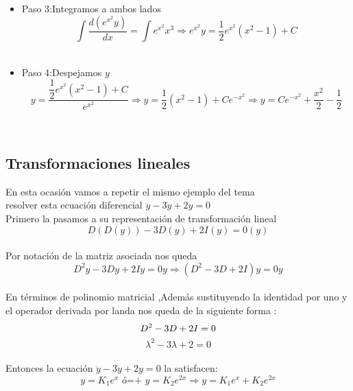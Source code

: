 \documentclass[10pt,a4paper]{article}
\begin{document}
{{{{{{{{{{{{\begin{itemize}
\item Paso 3:Integramos a ambos lados
\begin{equation*}
\int \dfrac{d(e^{x^2}y)}{dx}=\int e^{x^2}x^3 \Rightarrow e^{x^2}y=\dfrac{1}{2}e^{x^2}(x^{2}-1)+C
\end{equation*}
\,\\

\item Paso 4:Despejamos $y$
\begin{equation*}
y=\dfrac{\dfrac{1}{2}e^{x^2}(x^{2}-1)+C}{e^{x^2}}\Rightarrow y=\dfrac{1}{2}(x^{2}-1)+Ce^{-x^2}\Rightarrow y=Ce^{-x^2}+\dfrac{x^2}{2}-\dfrac{1}{2}
\end{equation*}
\end{itemize}
\,\\
\subsection{Transformaciones lineales}
En esta ocasión vamos a repetir el mismo ejemplo del tema\\resolver esta ecuación diferencial $ \ddot{y}-3\dot{y}+2y=0$\\

Primero la pasamos a su representación de transformación lineal
\begin{equation*}
D(D(y))-3D(y)+2I(y)=0(y)
\end{equation*}\\
Por notación de la matriz asociada nos queda
\begin{equation*}
D^{2}y-3Dy+2Iy=0y\Rightarrow (D^{2}-3D+2I)y=0y
\end{equation*}\\
En términos de polinomio matricial ,Además sustituyendo la identidad por uno y el operador derivada por landa nos queda de la siguiente forma :
\begin{equation*}
D^{2}-3D+2I=0\\
\end{equation*}
\begin{equation}\tag{$\lambda _1=1\,$ y $\lambda _2=2$}
\lambda ^{2}-3\lambda +2 =0
\end{equation}\\

Entonces la ecuación $ \ddot{y}-3\dot{y}+2y=0$ la satisfacen:
\begin{equation*}
y=K_1e^{x} \textbf{ ó=+ } y=K_2e^{2x}\Rightarrow y=K_1e^{x}+K_2e^{2x}
\end{equation*}

}}}}}}}}}}}}
\end{document}
